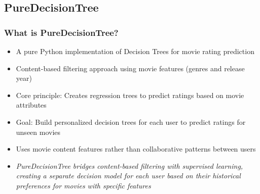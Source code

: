\documentclass{beamer}
\begin{document}
\subsection{PureDecisionTree}
\begin{frame}
\frametitle{What is PureDecisionTree?}

\begin{itemize}
    \item A pure Python implementation of Decision Trees for movie rating prediction
    \item Content-based filtering approach using movie features (genres and release year)
    \item Core principle: Creates regression trees to predict ratings based on movie attributes
    \item Goal: Build personalized decision trees for each user to predict ratings for unseen movies
    \item Uses movie content features rather than collaborative patterns between users
    
    \vspace{1cm}

    \item \textit{PureDecisionTree bridges content-based filtering with supervised learning, creating a separate decision model for each user based on their historical preferences for movies with specific features}
\end{itemize}
\end{frame}
\end{document}
